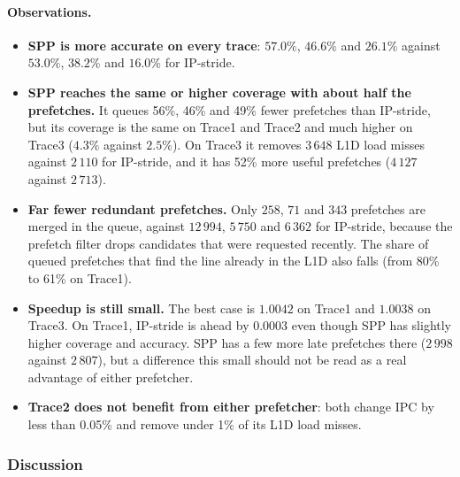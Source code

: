 \documentclass[11pt,a4paper]{article}
\begin{document}
\paragraph{Observations.}
\begin{itemize}
    \item \textbf{SPP is more accurate on every trace}: $57.0\%$, $46.6\%$ and $26.1\%$ against
          $53.0\%$, $38.2\%$ and $16.0\%$ for IP-stride.
    \item \textbf{SPP reaches the same or higher coverage with about half the prefetches.} It queues
          56\%, 46\% and 49\% fewer prefetches than IP-stride, but its coverage is the same on Trace1
          and Trace2 and much higher on Trace3 ($4.3\%$ against $2.5\%$). On Trace3 it removes $3\,648$
          L1D load misses against $2\,110$ for IP-stride, and it has 52\% more useful prefetches
          ($4\,127$ against $2\,713$).
    \item \textbf{Far fewer redundant prefetches.} Only $258$, $71$ and $343$ prefetches are merged
          in the queue, against $12\,994$, $5\,750$ and $6\,362$ for IP-stride, because the prefetch
          filter drops candidates that were requested recently. The share of queued prefetches that
          find the line already in the L1D also falls (from 80\% to 61\% on Trace1).
    \item \textbf{Speedup is still small.} The best case is $1.0042$ on Trace1 and $1.0038$ on
          Trace3. On Trace1, IP-stride is ahead by $0.0003$ even though SPP has slightly higher
          coverage and accuracy. SPP has a few more late prefetches there ($2\,998$ against $2\,807$),
          but a difference this small should not be read as a real advantage of either prefetcher.
    \item \textbf{Trace2 does not benefit from either prefetcher}: both change IPC by less than
          0.05\% and remove under 1\% of its L1D load misses.
\end{itemize}

\subsubsection{Discussion}
\end{document}
